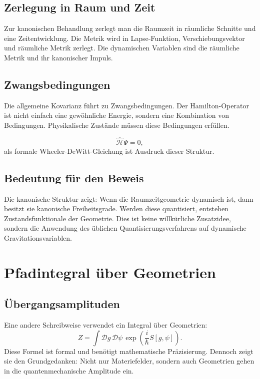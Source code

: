 \documentclass[11pt,a4paper,openany]{book}
\theoremstyle{remark}
\begin{document}
\section{Zerlegung in Raum und Zeit}
Zur kanonischen Behandlung zerlegt man die Raumzeit in räumliche Schnitte und eine Zeitentwicklung. Die Metrik wird in Lapse-Funktion, Verschiebungsvektor und räumliche Metrik zerlegt. Die dynamischen Variablen sind die räumliche Metrik und ihr kanonischer Impuls.

\section{Zwangsbedingungen}
Die allgemeine Kovarianz führt zu Zwangsbedingungen. Der Hamilton-Operator ist nicht einfach eine gewöhnliche Energie, sondern eine Kombination von Bedingungen. Physikalische Zustände müssen diese Bedingungen erfüllen.

\begin{equation}
\hat{\mathcal{H}}\Psi=0,
\end{equation}
als formale Wheeler-DeWitt-Gleichung ist Ausdruck dieser Struktur.

\section{Bedeutung für den Beweis}
Die kanonische Struktur zeigt: Wenn die Raumzeitgeometrie dynamisch ist, dann besitzt sie kanonische Freiheitsgrade. Werden diese quantisiert, entstehen Zustandsfunktionale der Geometrie. Dies ist keine willkürliche Zusatzidee, sondern die Anwendung des üblichen Quantisierungsverfahrens auf dynamische Gravitationsvariablen.

\chapter{Pfadintegral über Geometrien}
\section{Übergangsamplituden}
Eine andere Schreibweise verwendet ein Integral über Geometrien:
\begin{equation}
Z=\int \mathcal{D}g\,\mathcal{D}\psi\,\exp\left(\frac{i}{\hbar}S[g,\psi]\right).
\end{equation}
Diese Formel ist formal und benötigt mathematische Präzisierung. Dennoch zeigt sie den Grundgedanken: Nicht nur Materiefelder, sondern auch Geometrien gehen in die quantenmechanische Amplitude ein.
\end{document}
